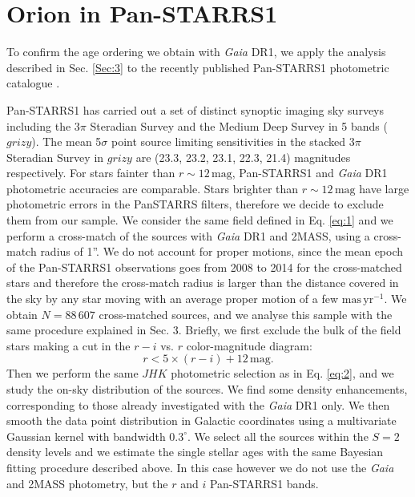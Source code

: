 \documentclass[twocolumn]{aa}
\begin{document}
\section{Orion in Pan-STARRS1} 
To confirm the age ordering we obtain with \textit{Gaia} DR1,  we apply the analysis described in Sec. \ref{Sec:3} to the recently published Pan-STARRS1 photometric catalogue \citep{Chambers2016,Magnier2016}.

Pan-STARRS1 has carried out a set of distinct synoptic imaging sky surveys including the $3\pi$ Steradian Survey and the Medium Deep Survey in 5 bands ($grizy$). The mean 5$\sigma$ point source limiting sensitivities in the stacked 3$\pi$ Steradian Survey in $grizy$ are (23.3, 23.2, 23.1, 22.3, 21.4) magnitudes respectively. For stars fainter than $r \sim 12 \, \mathrm{mag}$, Pan-STARRS1 and \textit{Gaia} DR1 photometric accuracies are comparable. Stars brighter than $r \sim 12 \, \mathrm{mag}$ have large photometric errors in the PanSTARRS filters, therefore we decide to exclude them from our sample. 
We consider the same field defined in Eq. \eqref{eq:1} and we perform a cross-match of the sources with \textit{Gaia} DR1 and 2MASS, using a cross-match radius of 1''. We do not account for proper motions, since the mean epoch of the Pan-STARRS1 observations goes from 2008 to 2014 for the cross-matched stars and therefore the cross-match radius is larger than the distance covered in the sky by any star moving with an average proper motion of a few $\mathrm{mas \, yr^{-1}}$.
We obtain $N = 88 \, 607$ cross-matched sources, and we analyse this sample with the same procedure explained in Sec. 3. Briefly, we first exclude the bulk of the field stars making a cut in the $r-i$ vs. $r$ color-magnitude diagram:
\begin{equation}
r <  5 \times (r-i)+ 12 \, \mathrm{mag}.
\end{equation}
Then we perform the same $JHK$ photometric selection as in Eq. \ref{eq:2}, and we study the on-sky distribution of the sources. We find some density enhancements, corresponding to those already investigated with the \textit{Gaia} DR1 only. We then smooth
the data point distribution in Galactic coordinates using a multivariate Gaussian kernel with bandwidth $0.3^{\circ}$. 
We select all the sources within the $S = 2$ density levels and we estimate the single stellar ages with the same Bayesian fitting procedure described above. 
In this case however we do not use the \textit{Gaia} and 2MASS photometry, but the $r$ and $i$ Pan-STARRS1 bands.  
\end{document}

